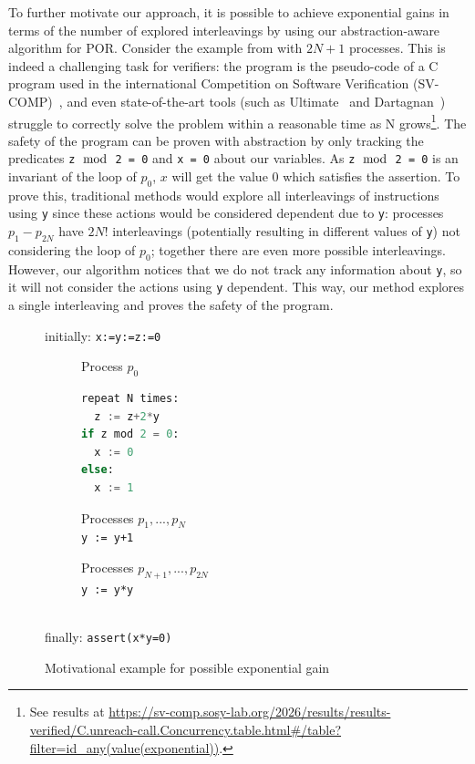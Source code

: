\documentclass[numbook]{svjour3}
\begin{document}
To further motivate our approach, it is possible to achieve exponential gains in terms of the number of explored interleavings by using our abstraction-aware algorithm for POR. Consider the example from  with $2N+1$ processes. This is indeed a challenging task for verifiers: the program is the pseudo-code of a C program used in the international Competition on Software Verification (SV-COMP)~\cite{svcomp-2025}, and even state-of-the-art tools (such as Ultimate~\cite{ugemcutter} and Dartagnan~\cite{dartagnan}) struggle to correctly solve the problem within a reasonable time as N grows\footnote{See results at \url{https://sv-comp.sosy-lab.org/2026/results/results-verified/C.unreach-call.Concurrency.table.html\#/table?filter=id_any(value(exponential))}.}. The safety of the program can be proven with abstraction by only tracking the predicates \texttt{z~$\bmod$~2~=~0} and \texttt{x~=~0} about our variables. As \texttt{z~$\bmod$~2~=~0} is an invariant of the loop of $p_0$, $x$ will get the value $0$ which satisfies the assertion. To prove this, traditional methods would explore all interleavings of instructions using \texttt{y} since these actions would be considered dependent due to \texttt{y}: processes $p_1 - p_{2N}$ have $2N!$ interleavings (potentially resulting in different values of \texttt{y}) not considering the loop of $p_0$; together there are even more possible interleavings. However, our algorithm notices that we do not track any information about \texttt{y}, so it will not consider the actions using \texttt{y} dependent. This way, our method explores a single interleaving and proves the safety of the program.

\begin{figure}[t]
	\centering
	initially: \texttt{x:=y:=z:=0}
	\vspace{0.3em}\\
	\begin{subfigure}[t]{.25\textwidth}
		\centering
		Process $p_0$
		
		\begin{lstlisting}[language=python,basicstyle=\ttfamily,mathescape=true,backgroundcolor=\color{white},aboveskip=0.5em,frame=none]
repeat N times:
  z := z+2*y
if z mod 2 = 0:
  x := 0
else:
  x := 1
		\end{lstlisting}
	\end{subfigure}
	\begin{subfigure}[t]{.25\textwidth}
		\centering
		Processes $p_1, ..., p_N$
		\vspace{0.5em}\\
		\texttt{y := y+1}
		
		\vspace{2em}
		
		Processes $p_{N+1}, ..., p_{2N}$
		\vspace{0.5em}\\
		\texttt{y := y*y}
	\end{subfigure}\\
	\vspace{0.3em}
	finally: \texttt{assert(x*y=0)}
	\caption{Motivational example for possible exponential gain}
	\label{fig:por-exponential-motivational-example}
\end{figure}
\end{document}
